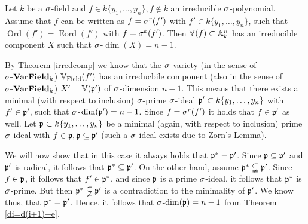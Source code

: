 \begin{cor}
Let $k$ be a $\sigma$-field and $f \in k\{y_1,\ldots,y_n\}, f \notin k$ an irreducible $\sigma$-polynomial. Assume that $f$ can be written as $f = \sigma^r(f')$ with $f' \in k\{y_1,\ldots,y_n\}$, such that $\operatorname{Ord}(f') = \operatorname{Eord}(f')$  with $f = \sigma^k(f')$. 
Then $\mathbb{V}(f) \subset \mathbb{A}_k^n$ has an irreducible component $X$ such that $\sigma$-$\dim(X) = n-1$.
\begin{bew}
By Theorem \ref{irredcomp} we know that the $\sigma$-variety (in the sense of $\sigma\text{{\normalfont\textbf{-VarField}}}_k$) $ \mathbb{V}_{\operatorname{Field}}(f')$ has an irreducbile component (also in the sense of $\sigma\text{{\normalfont\textbf{-VarField}}}_k$) $X' = \mathbb{V}(\mathfrak{p}')$ of $\sigma$-dimension $n-1$.
This means that there exists a minimal (with respect to inclusion) $\sigma$-prime $\sigma$-ideal $\mathfrak{p}' \subset k\{y_1,\ldots,y_n\}$ with $f' \in \mathfrak{p}'$, such that $\sigma$-$\dim(\mathfrak{p}') = n-1$. 
Since $f = \sigma^r(f')$ it holds that $f \in \mathfrak{p}'$ as well. Let $\mathfrak{p} \subset k\{y_1,\ldots,y_n\}$ be a minimal (again, with respect to inclusion) prime $\sigma$-ideal with $f \in \mathfrak{p}, \mathfrak{p} \subseteq \mathfrak{p}'$ (such a $\sigma$-ideal exists due to Zorn's Lemma). 

We will now show that in this case it always holds that $\mathfrak{p}^* = \mathfrak{p}'$. Since $\mathfrak{p} \subseteq \mathfrak{p}'$ and $\mathfrak{p}'$ is radical, it follows that $\mathfrak{p}^* \subseteq \mathfrak{p}'$. On the other hand, assume $\mathfrak{p}^* \subsetneqq \mathfrak{p}'$. Since $f \in \mathfrak{p}$, it follows that $f' \in \mathfrak{p}^*$,
and since $\mathfrak{p}$ is a prime $\sigma$-ideal, it follows that $\mathfrak{p}^*$ is $\sigma$-prime. But then $\mathfrak{p}^* \subsetneqq \mathfrak{p}'$ is a contradiction to the minimality of $\mathfrak{p}'$. We know thus, that $\mathfrak{p}^* = \mathfrak{p}'$. Hence, it follows that $\sigma$-$\dim(\mathfrak{p}) = n -1$ from Theorem \ref{di=d(i+1)+e}.

\end{bew}
\end{cor}


